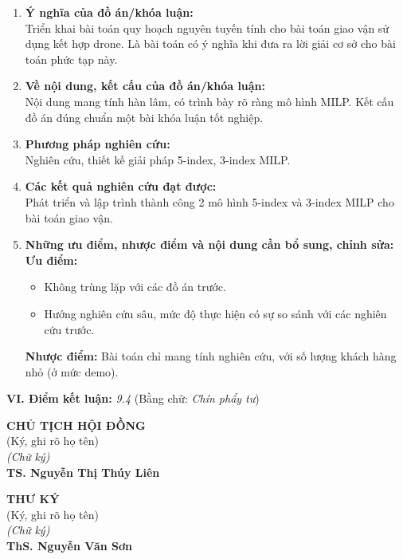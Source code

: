 \begin{enumerate}
    \item \textbf{Ý nghĩa của đồ án/khóa luận:}\\
    Triển khai bài toán quy hoạch nguyên tuyến tính cho bài toán giao vận sử dụng kết hợp drone. Là bài toán có ý nghĩa khi đưa ra lời giải cơ sở cho bài toán phức tạp này.

    \item \textbf{Về nội dung, kết cấu của đồ án/khóa luận:}\\
    Nội dung mang tính hàn lâm, có trình bày rõ ràng mô hình MILP. Kết cấu đồ án đúng chuẩn một bài khóa luận tốt nghiệp.

    \item \textbf{Phương pháp nghiên cứu:}\\
    Nghiên cứu, thiết kế giải pháp 5-index, 3-index MILP.

    \item \textbf{Các kết quả nghiên cứu đạt được:}\\
    Phát triển và lập trình thành công 2 mô hình 5-index và 3-index MILP cho bài toán giao vận.

    \item \textbf{Những ưu điểm, nhược điểm và nội dung cần bổ sung, chỉnh sửa:}\\
    \textbf{Ưu điểm:}
    \begin{itemize}
        \item Không trùng lặp với các đồ án trước.
        \item Hướng nghiên cứu sâu, mức độ thực hiện có sự so sánh với các nghiên cứu trước.
    \end{itemize}
    \textbf{Nhược điểm:} Bài toán chỉ mang tính nghiên cứu, với số lượng khách hàng nhỏ (ở mức demo).
\end{enumerate}

\vspace{0.4cm}
\noindent\textbf{VI. Điểm kết luận:} \textit{9.4} \hfill (Bằng chữ: \textit{Chín phẩy tư})

\vspace{0.8cm}

\noindent
\begin{minipage}[t]{0.48\textwidth}
    \begin{center}
        \textbf{CHỦ TỊCH HỘI ĐỒNG}\\[0.2cm]
        (Ký, ghi rõ họ tên)\\[1cm]
        \textit{(Chữ ký)}\\[0.5cm]
        \textbf{TS. Nguyễn Thị Thúy Liên}
    \end{center}
\end{minipage}
\hfill
\begin{minipage}[t]{0.48\textwidth}
    \begin{center}
        \textbf{THƯ KÝ}\\[0.2cm]
        (Ký, ghi rõ họ tên)\\[1cm]
        \textit{(Chữ ký)}\\[0.5cm]
        \textbf{ThS. Nguyễn Văn Sơn}
    \end{center}
\end{minipage}